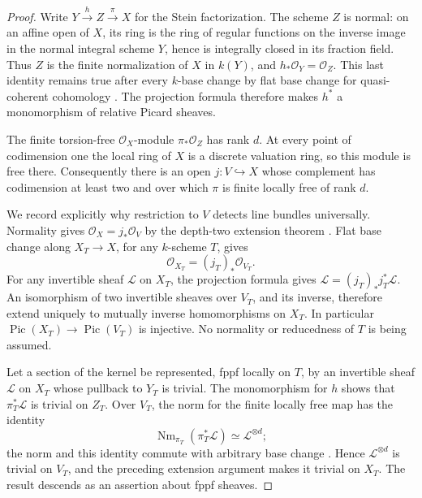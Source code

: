 \begin{proof}
Write $Y\xrightarrow{h}Z\xrightarrow{\pi}X$ for the Stein
factorization.  The scheme $Z$ is normal: on an affine open of $X$,
its ring is the ring of regular functions on the inverse image in
the normal integral scheme $Y$, hence is integrally closed in its
fraction field.  Thus $Z$ is the finite normalization of $X$ in
$k(Y)$, and $h_*\mathcal O_Y=\mathcal O_Z$.
This last identity remains true after every $k$-base change by flat
base change for quasi-coherent cohomology
\cite[Lemma 30.5.2, Tag 02KH]{StacksB}.
The projection formula therefore makes $h^*$ a monomorphism of
relative Picard sheaves.

The finite torsion-free $\mathcal O_X$-module $\pi_*\mathcal O_Z$
has rank $d$.  At every point of codimension one the local ring of
$X$ is a discrete valuation ring, so this module is free there.
Consequently there is an open $j:V\hookrightarrow X$ whose complement
has codimension at least two and over which $\pi$ is finite locally
free of rank $d$.

We record explicitly why restriction to $V$ detects line bundles
universally.  Normality gives $\mathcal O_X=j_*\mathcal O_V$ by
the depth-two extension theorem
\cite[Lemma 31.13.12, Tag 0EBJ]{StacksB}.
Flat base change along $X_T\to X$, for any $k$-scheme $T$, gives
\[
 \mathcal O_{X_T}=(j_T)_*\mathcal O_{V_T}.
\]
For any invertible sheaf $\mathcal L$ on $X_T$, the projection
formula gives $\mathcal L=(j_T)_*j_T^*\mathcal L$.
An isomorphism of two invertible sheaves over $V_T$, and its inverse,
therefore extend uniquely to mutually inverse homomorphisms on $X_T$.
In particular $\operatorname{Pic}(X_T)\to\operatorname{Pic}(V_T)$
is injective.  No normality or reducedness of $T$ is being assumed.

Let a section of the kernel be represented, fppf locally on $T$,
by an invertible sheaf $\mathcal L$ on $X_T$ whose pullback to
$Y_T$ is trivial.  The monomorphism for $h$ shows that
$\pi_T^*\mathcal L$ is trivial on $Z_T$.  Over $V_T$, the norm
for the finite locally free map has the identity
\[
 \operatorname{Nm}_{\pi_T}(\pi_T^*\mathcal L)
       \simeq\mathcal L^{\otimes d};
\]
the norm and this identity commute with arbitrary base change
\cite[Lemmas 31.18.2 and 31.18.6, Tags 0BCY and 0BD2]
{StacksB}.  Hence $\mathcal L^{\otimes d}$ is trivial on
$V_T$, and the preceding extension argument makes it trivial on
$X_T$.  The result descends as an assertion about fppf sheaves.
\end{proof}

